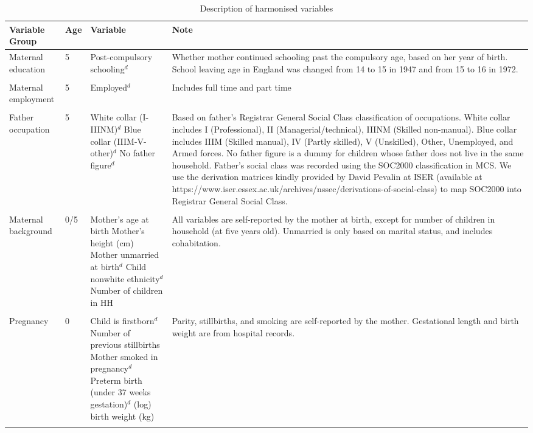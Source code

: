 \begin{landscape}
\begin{table}[ht!]
\caption{Description of harmonised variables}\label{tab:harmvar}
\centering{} \scriptsize
\begin{tabular}{L{.18\textwidth}C{.1\textwidth}L{.3\textwidth}L{.75\textwidth}}
\toprule
Variable Group & Age & Variable & Note \\
\midrule
Maternal education & 5 & Post-compulsory schooling$^d$ & Whether mother continued schooling past the compulsory age, based on her year of birth. School leaving age in England was changed from 14 to 15 in 1947 and from 15 to 16 in 1972. \\ \\[-1.5em]
Maternal employment & 5 & Employed$^d$ & Includes full time and part time \\ \\[-1.5em]
Father occupation & 5 & White collar (I-IIINM)$^d$ \newline Blue collar (IIIM-V-other)$^d$ \newline No father figure$^d$ & Based on father's Registrar General Social Class classification of occupations. White collar includes I (Professional), II (Managerial/technical), IIINM (Skilled non-manual). Blue collar includes IIIM (Skilled manual), IV (Partly skilled), V (Unskilled), Other, Unemployed, and Armed forces. No father figure is a dummy for children whose father does not live in the same household. Father's social class was recorded using the SOC2000 classification in MCS. We use the derivation matrices kindly provided by David Pevalin at ISER (available at https://www.iser.essex.ac.uk/archives/nssec/derivations-of-social-class) to map SOC2000 into Registrar General Social Class. \\ \\[-1.5em]
Maternal background & 0/5 & Mother's age at birth \newline Mother's height (cm) \newline Mother unmarried at birth$^d$ \newline Child nonwhite ethnicity$^d$  \newline Number of children in HH & All variables are self-reported by the mother at birth, except for number of children in household (at five years old). Unmarried is only based on marital status, and includes cohabitation. \\ \\[-1.5em]
Pregnancy & 0 & Child is firstborn$^d$ \newline Number of previous stillbirths \newline Mother smoked in pregnancy$^d$ \newline Preterm birth (under 37 weeks gestation)$^d$ \newline (log) birth weight (kg) & Parity, stillbirths, and smoking are self-reported by the mother. Gestational length and birth weight are from hospital records. \\ \\[-1.5em]

\end{tabular}
\end{table}
\end{landscape}

